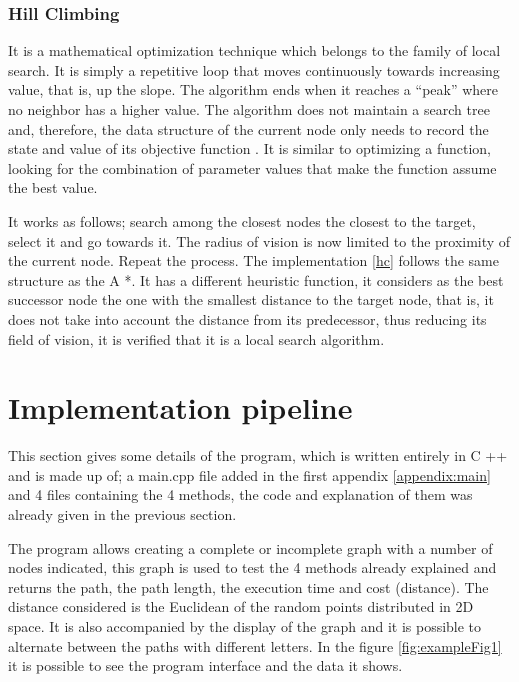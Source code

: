 \documentclass[12pt]{article}
\begin{document}
        \subsubsection{Hill Climbing}
        It is a mathematical optimization technique which belongs to the family of local search. It is simply a repetitive loop that moves continuously towards increasing value, that is, up the slope. The algorithm ends when it reaches a “peak” where no neighbor has a higher value. The algorithm does not maintain a search tree and, therefore, the data structure of the current node only needs to record the state and value of its objective function \cite{russell2004inteligencia}. It is similar to optimizing a function, looking for the combination of parameter values that make the function assume the best value.
        
        It works as follows; search among the closest nodes the closest to the target, select it and go towards it. The radius of vision is now limited to the proximity of the current node. Repeat the process. 
        The implementation \ref{hc} follows the same structure as the A *. It has a different heuristic function, it considers as the best successor node the one with the smallest distance to the target node, that is, it does not take into account the distance from its predecessor, thus reducing its field of vision, it is verified that it is a local search algorithm.
        

\section{Implementation pipeline}
This section gives some details of the program, which is written entirely in C ++ and is made up of; a main.cpp file added in the first appendix \ref{appendix:main} and 4 files containing the 4 methods, the code and explanation of them was already given in the previous section.

The program allows creating a complete or incomplete graph with a number of nodes indicated, this graph is used to test the 4 methods already explained and returns the path, the path length, the execution time and cost (distance). The distance considered is the Euclidean of the random points distributed in 2D space.
It is also accompanied by the display of the graph and it is possible to alternate between the paths with different letters. In the figure \ref{fig:exampleFig1} it is possible to see the program interface and the data it shows.
\end{document}
